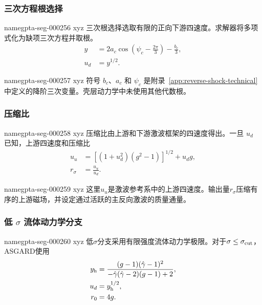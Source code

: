 \documentclass[twocolumn]{aastex702}
\makeatletter
\newcommand{\asgard}{\textsc{ASGARD}}
\providecommand{\gptareaderanchor}[1]{\pdfdest name{#1} xyz}%
\providecommand{\gptareaderanchor}[1]{\special{pdf:dest (#1) [ @thispage /XYZ @xpos @ypos null ]}}%
\makeatother
\begin{document}
\subsubsection{三次方程根选择}


\gptareaderanchor{gpta-seg-000256}%
三次根选择选取有限的正向下游四速度。求解器将多项式化为缺项三次方程并取根。
\begin{equation}
\begin{aligned}
y&=2a_c\cos\left(\psi_c-\frac{2\pi}{3}\right)-\frac{b_c}{3},\\
u_d&=y^{1/2}.
\end{aligned}
\end{equation}

\gptareaderanchor{gpta-seg-000257}%
符号 \(b_c\)、\(a_c\) 和 \(\psi_c\) 是附录~\ref{app:reverse-shock-technical} 中定义的降阶三次变量。壳层动力学中未使用其他代数根。

\subsubsection{压缩比}


\gptareaderanchor{gpta-seg-000258}%
压缩比由上游和下游激波框架的四速度得出。一旦 \(u_d\) 已知，上游四速度和压缩比
\begin{equation}
\begin{aligned}
u_u&=\left[(1+u_d^2)(g^2-1)\right]^{1/2}+u_dg,\\
r_\sigma&=\frac{u_u}{u_d}.
\end{aligned}
\end{equation}

\gptareaderanchor{gpta-seg-000259}%
这里\(u_u\)是激波参考系中的上游四速度。输出量\(r_\sigma\)压缩有序的上游磁场，并设定通过活跃的主反向激波的质量通量。

\subsubsection{\texorpdfstring{低 \(\sigma\)}{Low-sigma} 流体动力学分支}


\gptareaderanchor{gpta-seg-000260}%
低\(\sigma\)分支采用有限强度流体动力学极限。对于\(\sigma\le\sigma_{\rm cut}\)，\asgard 使用
\begin{equation}
\begin{aligned}
y_{\rm h}&=
\frac{(g-1)(\hat{\gamma}-1)^2}
{-\hat{\gamma}(\hat{\gamma}-2)(g-1)+2},\\
u_d&=y_{\rm h}^{1/2},\\
r_0&=4g .
\end{aligned}
\end{equation}
\end{document}
